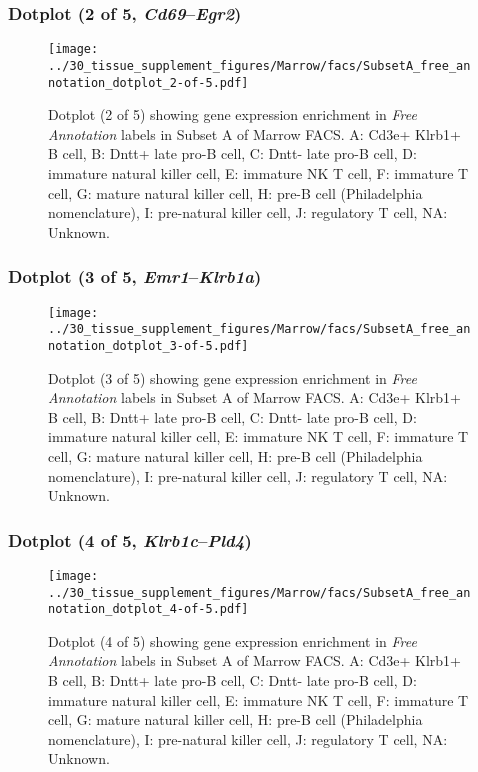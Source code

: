 \clearpage

\subsubsection{Dotplot (2 of 5, \emph{Cd69}--\emph{Egr2})}
\begin{figure}[h]
\centering
\texttt{[image: ../30\_tissue\_supplement\_figures/Marrow/facs/SubsetA\_free\_annotation\_dotplot\_2-of-5.pdf]}

\caption{ Dotplot (2 of 5)  showing gene expression enrichment in \emph{Free Annotation} labels in Subset A of Marrow FACS. A: Cd3e+ Klrb1+ B cell, B: Dntt+ late pro-B cell, C: Dntt- late pro-B cell, D: immature natural killer cell, E: immature NK T cell, F: immature T cell, G: mature natural killer cell, H: pre-B cell (Philadelphia nomenclature), I: pre-natural killer cell, J: regulatory T cell, NA: Unknown.}
\end{figure}


\clearpage

\subsubsection{Dotplot (3 of 5, \emph{Emr1}--\emph{Klrb1a})}
\begin{figure}[h]
\centering
\texttt{[image: ../30\_tissue\_supplement\_figures/Marrow/facs/SubsetA\_free\_annotation\_dotplot\_3-of-5.pdf]}

\caption{ Dotplot (3 of 5)  showing gene expression enrichment in \emph{Free Annotation} labels in Subset A of Marrow FACS. A: Cd3e+ Klrb1+ B cell, B: Dntt+ late pro-B cell, C: Dntt- late pro-B cell, D: immature natural killer cell, E: immature NK T cell, F: immature T cell, G: mature natural killer cell, H: pre-B cell (Philadelphia nomenclature), I: pre-natural killer cell, J: regulatory T cell, NA: Unknown.}
\end{figure}


\clearpage

\subsubsection{Dotplot (4 of 5, \emph{Klrb1c}--\emph{Pld4})}
\begin{figure}[h]
\centering
\texttt{[image: ../30\_tissue\_supplement\_figures/Marrow/facs/SubsetA\_free\_annotation\_dotplot\_4-of-5.pdf]}

\caption{ Dotplot (4 of 5)  showing gene expression enrichment in \emph{Free Annotation} labels in Subset A of Marrow FACS. A: Cd3e+ Klrb1+ B cell, B: Dntt+ late pro-B cell, C: Dntt- late pro-B cell, D: immature natural killer cell, E: immature NK T cell, F: immature T cell, G: mature natural killer cell, H: pre-B cell (Philadelphia nomenclature), I: pre-natural killer cell, J: regulatory T cell, NA: Unknown.}
\end{figure}


